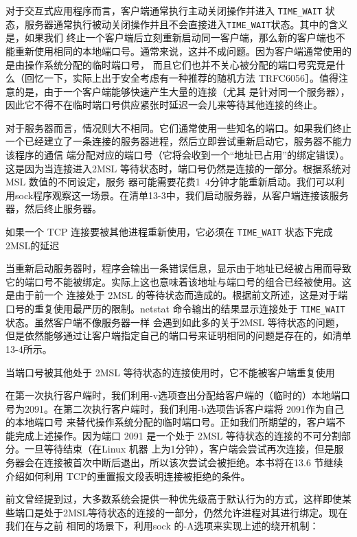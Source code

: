 对于交互式应用程序而言，客户端通常执行主动关闭操作并进入 \verb|TIME_WAIT| 状态，服务器通常执行被动关闭操作并且不会直接进入\verb|TIME_WAIT|状态。其中的含义是，如果我们
终止一个客户端后立刻重新启动同一客户端，那么新的客户端也不能重新使用相同的本地端口号。通常来说，这并不成问题。因为客户端通常使用的是由操作系统分配的临时端口号，
而且它们也并不关心被分配的端口号究竞是什么（回忆一下，实际上出于安全考虑有一种推荐的随机方法 TRFC6056］。值得注意的是，由于一个客户端能够快速产生大量的连接（尤其
是针对同一个服务器），因此它不得不在临时端口号供应紧张时延迟一会儿来等待其他连接的终止。

对于服务器而言，情况则大不相同。它们通常使用一些知名的端口。如果我们终止一个已经建立了一条连接的服务器进程，然后立即尝试重新启动它，服务器不能力该程序的通信
端分配对应的端口号（它将会收到一个“地址已占用”的绑定错误）。这是因为当连接进入2MSL 等待状态时，端口号仍然是连接的一部分。根据系统对 MSL 数值的不同设定，服务
器可能需要花费1~4分钟才能重新启动。我们可以利用sock程序观察这一场景。在清单13-3中，我们启动服务器，从客户端连接该服务器，然后终止服务器。

如果一个 TCP 连接要被其他进程重新使用，它必须在 \verb|TIME_WAIT| 状态下完成 2MSL的延迟

当重新启动服务器时，程序会输出一条错误信息，显示由于地址已经被占用而导致它的端口号不能被绑定。实际上这也意味着该地址与端口号的组合已经被使用。这是由于前一个
连接处于 2MSL 的等待状态而造成的。根据前文所述，这是对于端口号的重复使用最严历的限制。netstat 命令输出的结果显示连接处于 \verb|TIME_WAIT| 状态。虽然客户端不像服务器一样
会遇到如此多的关于2MSL 等待状态的问题，但是依然能够通过让客户端指定自己的端口号来证明相同的问题是存在的，如清单13-4所示。

当端口号被其他处于 2MSL 等待状态的连接使用时，它不能被客户端重复使用

在第一次执行客户端时，我们利用-v选项查出分配给客户端的（临时的）本地端口号为2091。在第二次执行客户端时，我们利用-b选项告诉客户端将 2091作为自己的本地端口号
来替代操作系统分配的临时端口号。正如我们所期望的，客户端不能完成上述操作。因为端口 2091 是一个处于 2MSL 等待状态的连接的不可分割部分。一旦等待结束（在Linux 机器
上为1分钟），客户端会尝试再次连接，但是服务器会在连接被首次中断后退出，所以该次尝试会被拒绝。本书将在13.6 节继续介绍如何利用 TCP的重置报文段表明连接被拒绝的条件。

前文曾经提到过，大多数系统会提供一种优先级高于默认行为的方式，这样即使某些端口是处于2MSL等待状态的连接的一部分，仍然允许进程对其进行绑定。现在我们在与之前
相同的场景下，利用sock 的-A选项来实现上述的绕开机制：

